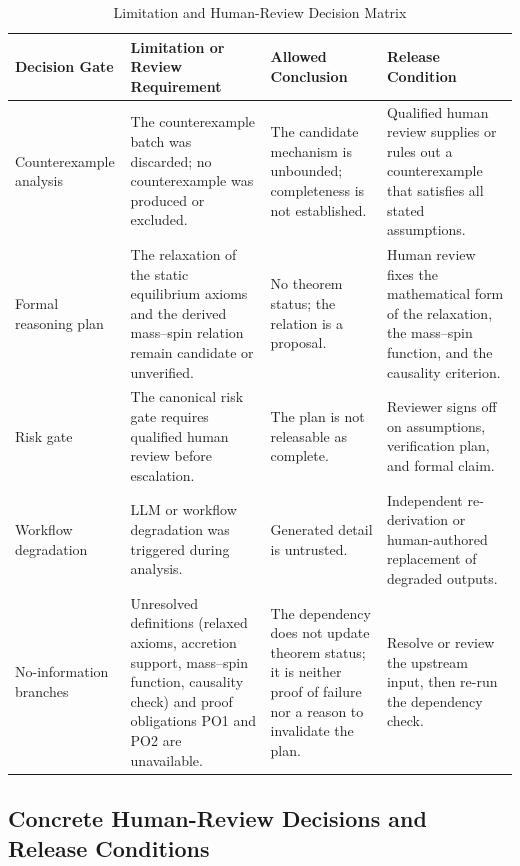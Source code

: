 \documentclass[conference]{IEEEtran}
\begin{document}
\begin{table}[htbp]
\centering
\footnotesize
\setlength{\tabcolsep}{3pt}
\renewcommand{\arraystretch}{1.12}
\caption{Limitation and Human-Review Decision Matrix}
\label{tab:risk-limitations-and-review-block-2}
\begin{tabular}{|p{}|p{}|p{}|p{}|}
\hline
Decision Gate & Limitation or Review Requirement & Allowed Conclusion & Release Condition \\\hline
Counterexample analysis & The counterexample batch was discarded; no counterexample was produced or excluded. & The candidate mechanism is unbounded; completeness is not established. & Qualified human review supplies or rules out a counterexample that satisfies all stated assumptions. \\\hline
Formal reasoning plan & The relaxation of the static equilibrium axioms and the derived mass--spin relation remain candidate or unverified. & No theorem status; the relation is a proposal. & Human review fixes the mathematical form of the relaxation, the mass--spin function, and the causality criterion. \\\hline
Risk gate & The canonical risk gate requires qualified human review before escalation. & The plan is not releasable as complete. & Reviewer signs off on assumptions, verification plan, and formal claim. \\\hline
Workflow degradation & LLM or workflow degradation was triggered during analysis. & Generated detail is untrusted. & Independent re-derivation or human-authored replacement of degraded outputs. \\\hline
No-information branches & Unresolved definitions (relaxed axioms, accretion support, mass--spin function, causality check) and proof obligations PO1 and PO2 are unavailable. & The dependency does not update theorem status; it is neither proof of failure nor a reason to invalidate the plan. & Resolve or review the upstream input, then re-run the dependency check. \\\hline
\end{tabular}
\end{table}

\subsection{Concrete Human-Review Decisions and Release Conditions}
\end{document}
